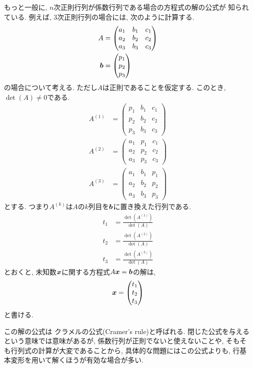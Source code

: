 もっと一般に,
$n$次正則行列が係数行列である場合の方程式の解の公式が
知られている.
例えば, $3$次正則行列の場合には,
次のように計算する.
\begin{align*}
  A&=
  \begin{pmatrix}a_1&b_1&c_1\\a_2&b_2&c_2\\a_3&b_3&c_3\end{pmatrix}\\
    \boldsymbol{b}&=
  \begin{pmatrix}p_1\\p_2\\p_3\end{pmatrix}
\end{align*}
の場合について考える.
ただし$A$は正則であることを仮定する.
このとき, $\det(A)\neq 0$である.
\begin{align*}
  A^{(1)}&=
  \begin{pmatrix}p_1&b_1&c_1\\p_2&b_2&c_2\\p_3&b_3&c_3\end{pmatrix}\\
  A^{(2)}&=
  \begin{pmatrix}a_1&p_1&c_1\\a_2&p_2&c_2\\a_3&p_3&c_3\end{pmatrix}\\
  A^{(3)}&=
  \begin{pmatrix}a_1&b_1&p_1\\a_2&b_2&p_2\\a_3&b_3&p_3\end{pmatrix}
\end{align*}
とする. つまり$A^{(k)}$は$A$の$k$列目を$\boldsymbol{b}$に置き換えた行列である.
\begin{align*}
  t_1&=\frac{\det(A^{(1)})}{\det(A)}\\
  t_2&=\frac{\det(A^{(2)})}{\det(A)}\\
  t_3&=\frac{\det(A^{(3)})}{\det(A)}
\end{align*}
とおくと, 未知数$\boldsymbol{x}$に関する方程式$A\boldsymbol{x}=\boldsymbol{b}$の解は,
\begin{align*}
  \boldsymbol{x}=
  \begin{pmatrix}
    t_1\\t_2\\t_3
  \end{pmatrix}
\end{align*}
と書ける.

この解の公式は
%
クラメルの公式(Cramer's rule)と呼ばれる.
閉じた公式を与えるという意味では意味があるが,
係数行列が正則でないと使えないことや,
そもそも行列式の計算が大変であることから,
具体的な問題にはこの公式よりも,
行基本変形を用いて解くほうが有効な場合が多い.

